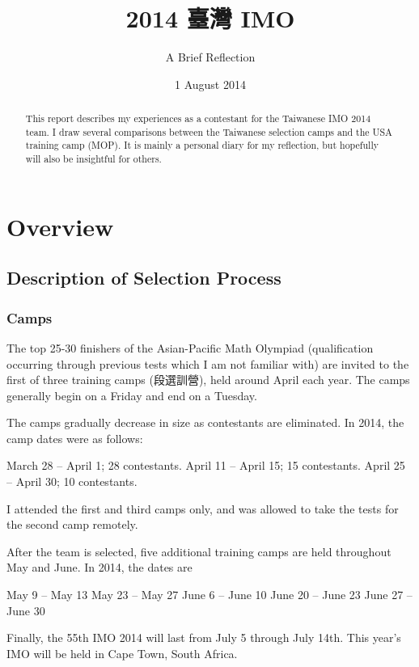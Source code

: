 \documentclass[11pt]{scrreprt}
\begin{document}
\title{2014 臺灣 IMO}
\subtitle{A Brief Reflection}
\date{1 August 2014}
\maketitle

\begin{abstract}
  This report describes my experiences as a contestant for the Taiwanese IMO 2014 team.
  I draw several comparisons between the Taiwanese selection camps and the USA training camp (MOP).
  It is mainly a personal diary for my reflection, but hopefully will also be insightful for others.
\end{abstract}

\tableofcontents

\chapter{Overview}
\section{Description of Selection Process}
\subsection{Camps}
The top 25-30 finishers of the Asian-Pacific Math Olympiad (qualification occurring through previous tests which I am not familiar with) are invited to the first of three training camps (段選訓營), held around April each year.  The camps generally begin on a Friday and end on a Tuesday.

The camps gradually decrease in size as contestants are eliminated. In 2014, the camp dates were as follows:
\begin{enumerate}
  \ii March 28 -- April 1; 28 contestants.
  \ii April 11 -- April 15; 15 contestants.
  \ii April 25 -- April 30; 10 contestants.
\end{enumerate}

I attended the first and third camps only, and was allowed to take the tests for the second camp remotely.

After the team is selected, five additional training camps are held throughout May and June. In 2014, the dates are
\begin{enumerate}
  \ii May 9 -- May 13
  \ii May 23 -- May 27
  \ii June 6 -- June 10
  \ii June 20 -- June 23
  \ii June 27 -- June 30
\end{enumerate}
Finally, the 55th IMO 2014 will last from July 5 through July 14th. This year's IMO will be held in Cape Town, South Africa.
\end{document}
